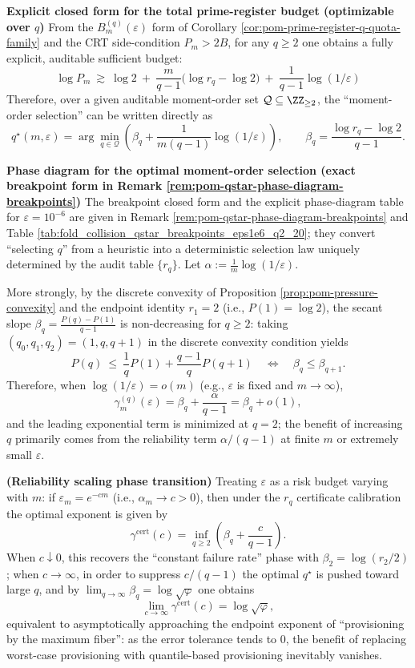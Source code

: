 \begin{remark}
\medskip\noindent\textbf{Explicit closed form for the total prime-register budget (optimizable over \(q\))}
From the \(B_m^{(q)}(\varepsilon)\) form of Corollary \ref{cor:pom-prime-register-q-quota-family} and the CRT side-condition \(P_m>2B\), for any \(q\ge 2\) one obtains a fully explicit, auditable sufficient budget:
\[
\boxed{\;
\log P_m\ \gtrsim\ \log 2\ +\ \frac{m}{q-1}\bigl(\log r_q-\log 2\bigr)\ +\ \frac{1}{q-1}\log(1/\varepsilon)\;}
\]
Therefore, over a given auditable moment-order set \(\mathcal{Q}\subseteq\ZZ_{\ge 2}\), the ``moment-order selection'' can be written directly as
\[
q^\star(m,\varepsilon)=\arg\min_{q\in\mathcal{Q}}\left(\beta_q+\frac{1}{m(q-1)}\log(1/\varepsilon)\right),
\qquad
\beta_q=\frac{\log r_q-\log 2}{q-1}.
\]

\medskip\noindent\textbf{Phase diagram for the optimal moment-order selection (exact breakpoint form in Remark \ref{rem:pom-qstar-phase-diagram-breakpoints})}
The breakpoint closed form and the explicit phase-diagram table for \(\varepsilon=10^{-6}\) are given in Remark \ref{rem:pom-qstar-phase-diagram-breakpoints} and Table \ref{tab:fold_collision_qstar_breakpoints_eps1e6_q2_20}; they convert ``selecting \(q\)'' from a heuristic into a deterministic selection law uniquely determined by the audit table \(\{r_q\}\).
Let \(\alpha:=\frac{1}{m}\log(1/\varepsilon)\).

More strongly, by the discrete convexity of Proposition \ref{prop:pom-pressure-convexity} and the endpoint identity \(r_1=2\) (i.e., \(P(1)=\log 2\)), the secant slope
\(
\beta_q=\frac{P(q)-P(1)}{q-1}
\)
is non-decreasing for \(q\ge 2\): taking \((q_0,q_1,q_2)=(1,q,q+1)\) in the discrete convexity condition yields
\[
P(q)\ \le\ \frac{1}{q}P(1)+\frac{q-1}{q}P(q+1)
\quad\Longleftrightarrow\quad
\beta_q\le \beta_{q+1}.
\]
Therefore, when \(\log(1/\varepsilon)=o(m)\) (e.g., \(\varepsilon\) is fixed and \(m\to\infty\)),
\[
\gamma_m^{(q)}(\varepsilon)=\beta_q+\frac{\alpha}{q-1}=\beta_q+o(1),
\]
and the leading exponential term is minimized at \(q=2\); the benefit of increasing \(q\) primarily comes from the reliability term \(\alpha/(q-1)\) at finite \(m\) or extremely small \(\varepsilon\).

\medskip\noindent\textbf{(Reliability scaling phase transition)}
Treating \(\varepsilon\) as a risk budget varying with \(m\): if \(\varepsilon_m=e^{-c m}\) (i.e., \(\alpha_m\to c>0\)), then under the \(r_q\) certificate calibration the optimal exponent is given by
\[
\gamma^{\mathrm{cert}}(c)
=\inf_{q\ge 2}\left(\beta_q+\frac{c}{q-1}\right).
\]
When \(c\downarrow 0\), this recovers the ``constant failure rate'' phase with \(\beta_2=\log(r_2/2)\);
when \(c\to\infty\), in order to suppress \(c/(q-1)\) the optimal \(q^\star\) is pushed toward large \(q\), and by \(\lim_{q\to\infty}\beta_q=\log\sqrt{\varphi}\) one obtains
\[
\lim_{c\to\infty}\gamma^{\mathrm{cert}}(c)=\log\sqrt{\varphi},
\]
equivalent to asymptotically approaching the endpoint exponent of ``provisioning by the maximum fiber'': as the error tolerance tends to 0, the benefit of replacing worst-case provisioning with quantile-based provisioning inevitably vanishes.


\end{remark}
